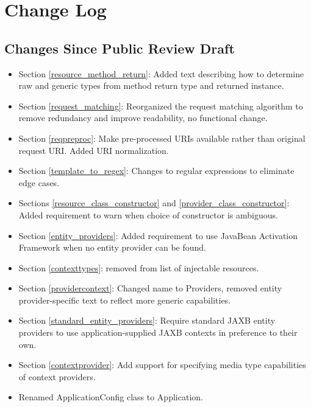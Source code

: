 \chapter{Change Log}

\section{Changes Since Public Review Draft}

\begin{itemize}
\item Section \ref{resource_method_return}: Added text describing how to determine raw and generic types from method return type and returned instance.
\item Section \ref{request_matching}: Reorganized the request matching algorithm to remove redundancy and improve readability, no functional change.
\item Section \ref{reqpreproc}: Make pre-processed URIs available rather than original request URI. Added URI normalization.
\item Section \ref{template_to_regex}: Changes to regular expressions to eliminate edge cases.
\item Sections \ref{resource_class_constructor} and \ref{provider_class_constructor}: Added requirement to warn when choice of constructor is ambiguous.
\item Section \ref{entity_providers}: Added requirement to use JavaBean Activation Framework when no entity provider can be found.
\item Section \ref{contexttypes}: removed  from list of injectable resources.
\item Section \ref{providercontext}: Changed name to Providers, removed entity provider-specific text to reflect more generic capabilities.
\item Section \ref{standard_entity_providers}: Require standard JAXB entity providers to use application-supplied JAXB contexts in preference to their own.
\item Section \ref{contextprovider}: Add support for specifying media type capabilities of context providers.
\item Renamed ApplicationConfig class to Application.
\end{itemize}